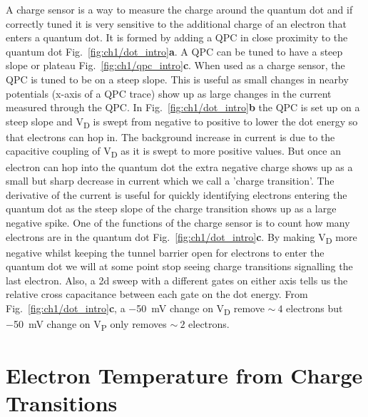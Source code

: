 A charge sensor is a way to measure the charge around the quantum dot and if correctly tuned it is very sensitive to the additional charge of an electron that enters a quantum dot. It is formed by adding a QPC in close proximity to the quantum dot Fig.~\ref{fig:ch1/dot_intro}\textbf{a}. A QPC can be tuned to have a steep slope or plateau  Fig.~\ref{fig:ch1/qpc_intro}\textbf{c}. When used as a charge sensor, the QPC is tuned to be on a steep slope. This is useful as small changes in nearby potentials (x-axis of a QPC trace) show up as large changes in the current measured through the QPC. In Fig.~\ref{fig:ch1/dot_intro}\textbf{b} the QPC is set up on a steep slope and V\textsubscript{D} is swept from negative to positive to lower the dot energy so that electrons can hop in. The background increase in current is due to the capacitive coupling of V\textsubscript{D} as it is swept to more positive values. But once an electron can hop into the quantum dot the extra negative charge shows up as a small but sharp decrease in current which we call a 'charge transition'. The derivative of the current is useful for quickly identifying electrons entering the quantum dot as the steep slope of the charge transition shows up as a large negative spike. One of the functions of the charge sensor is to count how many electrons are in the quantum dot Fig.~\ref{fig:ch1/dot_intro}\textbf{c}. By making V\textsubscript{D} more negative whilst keeping the tunnel barrier open for electrons to enter the quantum dot we will at some point stop seeing charge transitions signalling the last electron. Also, a 2d sweep with a different gates on either axis tells us the relative cross capacitance between each gate on the dot energy. From Fig.~\ref{fig:ch1/dot_intro}\textbf{c}, a \qty{-50}{mV} change on V\textsubscript{D} remove $\sim~4$ electrons but \qty{-50}{mV} change on V\textsubscript{P} only removes $\sim~2$ electrons.



\afterpage{\clearpage}
\section{Electron Temperature from Charge Transitions}

